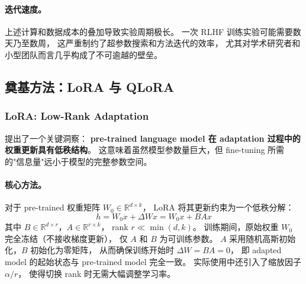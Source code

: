 \paragraph{迭代速度。}
上述计算和数据成本的叠加导致实验周期极长。
一次 RLHF 训练实验可能需要数天乃至数周，
这严重制约了超参数搜索和方法迭代的效率，
尤其对学术研究者和小型团队而言几乎构成了不可逾越的壁垒。


\subsection{奠基方法：LoRA 与 QLoRA}
\label{sec:t7-foundation}

\subsubsection{LoRA: Low-Rank Adaptation}
\label{sec:t7-lora}

 提出了一个关键洞察：
\textbf{pre-trained language model 在 adaptation 过程中的权重更新具有低秩结构}。
这意味着虽然模型参数量巨大，但 fine-tuning 所需的"信息量"远小于模型的完整参数空间。

\paragraph{核心方法。}
对于 pre-trained 权重矩阵 $W_0 \in \mathbb{R}^{d \times k}$，
LoRA 将其更新约束为一个低秩分解：
\begin{equation}
h = W_0 x + \Delta W x = W_0 x + B A x
\label{eq:lora}
\end{equation}
其中 $B \in \mathbb{R}^{d \times r}$，$A \in \mathbb{R}^{r \times k}$，
rank $r \ll \min(d, k)$。
训练期间，原始权重 $W_0$ 完全冻结（不接收梯度更新），
仅 $A$ 和 $B$ 为可训练参数。
$A$ 采用随机高斯初始化，$B$ 初始化为零矩阵，
从而确保训练开始时 $\Delta W = BA = 0$，
即 adapted model 的起始状态与 pre-trained model 完全一致。
实际使用中还引入了缩放因子 $\alpha / r$，
使得切换 rank 时无需大幅调整学习率。

